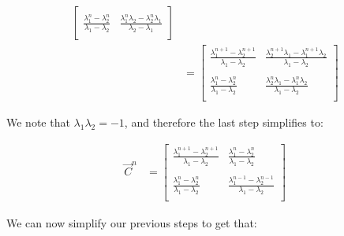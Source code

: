 \documentclass{article}
\begin{document}
\begin{align*}
\begin{bmatrix}
 & \\
\frac{\lambda_{1}^{n} - \lambda_{2}^{n}}{\lambda_{1}-\lambda_{2}} 
& \frac{\lambda_{1}^{n}\lambda_{2}-\lambda_{2}^{n}\lambda_{1}}{\lambda_{2}-\lambda_{1}}\\
\end{bmatrix}\\
&=
\begin{bmatrix}
\frac{\lambda_{1}^{n+1} - \lambda_{2}^{n+1}}{\lambda_{1}-\lambda_{2}} 
& \frac{\lambda_{2}^{n+1}\lambda_{1}-\lambda_{1}^{n+1}\lambda_{2}}{\lambda_{1}-\lambda_{2}}\\
 & \\
\frac{\lambda_{1}^{n} - \lambda_{2}^{n}}{\lambda_{1}-\lambda_{2}} 
& \frac{\lambda_{2}^{n}\lambda_{1}-\lambda_{1}^{n}\lambda_{2}}{\lambda_{1}-\lambda_{2}}\\
\end{bmatrix}
\end{align*}

We note that $\lambda_{1}\lambda_{2}=-1$, and therefore the last step simplifies to:

\begin{align*}
\vec{C}^{n}
&=
\begin{bmatrix}
\frac{\lambda_{1}^{n+1} - \lambda_{2}^{n+1}}{\lambda_{1}-\lambda_{2}} 
& \frac{\lambda_{1}^{n} - \lambda_{2}^{n}}{\lambda_{1}-\lambda_{2}}\\
 & \\
\frac{\lambda_{1}^{n} - \lambda_{2}^{n}}{\lambda_{1}-\lambda_{2}} 
& \frac{\lambda_{1}^{n-1} - \lambda_{2}^{n-1}}{\lambda_{1}-\lambda_{2}} \\
\end{bmatrix}
\end{align*}

We can now simplify our previous steps to get that:
\end{document}
